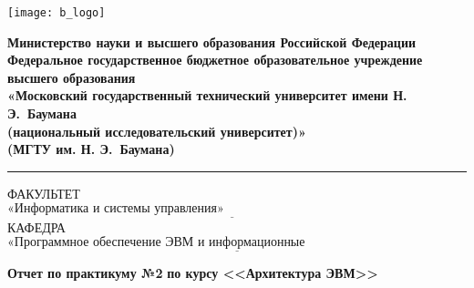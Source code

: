 \begin{titlepage}
	\fontsize{12pt}{12pt}\selectfont
	\noindent \begin{minipage}{0.15\textwidth}
		\texttt{[image: b\_logo]}
	\end{minipage}
	\noindent\begin{minipage}{0.9\textwidth}\centering
		\textbf{Министерство науки и высшего образования Российской Федерации}\\
		\textbf{Федеральное государственное бюджетное образовательное учреждение высшего образования}\\
		\textbf{«Московский государственный технический университет имени Н. Э.~Баумана}\\
		\textbf{(национальный исследовательский университет)»}\\
		\textbf{(МГТУ им. Н. Э.~Баумана)}
	\end{minipage}
	
	\noindent\rule{18cm}{3pt}
	\newline\newline
	\noindent ФАКУЛЬТЕТ $\underline{\text{«Информатика и системы управления»~~~~~~~~~~~~~~~~~~~~~~~~~~~~~~~~~~~~~~~~~~~~~~~~~~~~~~~}}$ \newline\newline
	\noindent КАФЕДРА $\underline{\text{«Программное обеспечение ЭВМ и информационные технологии»~~~~~~~~~~~~~~~~~~~~~~~}}$\newline\newline\newline\newline\newline\newline\newline
	
	
	\begin{center}
		\Large\textbf{Отчет по практикуму №2}
		\Large\textbf{по курсу <<Архитектура ЭВМ>>}
		
	\end{center}
	

\end{titlepage}

